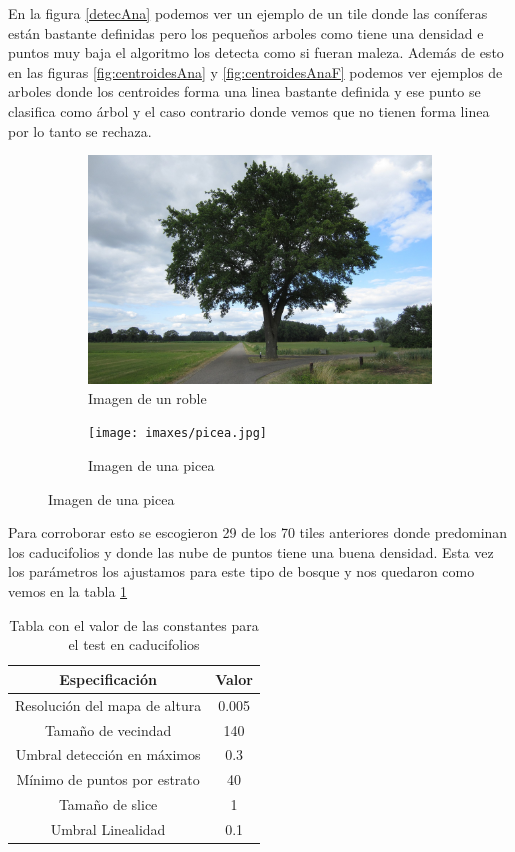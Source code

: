 En la figura \ref{detecAna} podemos ver un ejemplo de un tile donde las coníferas están bastante definidas pero los pequeños arboles como tiene una densidad e puntos muy baja el algoritmo los detecta como si fueran maleza. Además de esto en las figuras \ref{fig:centroidesAna} y \ref{fig:centroidesAnaF} podemos ver ejemplos de arboles donde los centroides forma una linea bastante definida y ese punto se clasifica como árbol y el caso contrario donde vemos que no tienen forma linea por lo tanto se rechaza.



\begin{figure}
  \begin{subfigure}{0.5\textwidth}
    \centering
    \includegraphics[width=0.8\linewidth]{imaxes/2019-07-03_Eik_in_Kerspel_Goor.jpg}
    \caption{Imagen de un roble}
  \end{subfigure}%
  \begin{subfigure}{0.5\textwidth}
    \centering
    \texttt{[image: imaxes/picea.jpg]}
    \caption{Imagen de una picea}
  \end{subfigure}
\end{figure}

Para corroborar esto se escogieron 29 de los 70 tiles anteriores donde predominan los caducifolios y donde las nube de puntos tiene una buena densidad. Esta vez los parámetros los ajustamos para este tipo de bosque y nos quedaron como vemos en la tabla \ref{tablavar2}

\begin{table}[h]
\centering
{}
\begin{tabular}{c|c}
\rowcolor{udcpink!25}
\textbf{Especificación} & \textbf{Valor} \\\hline


Resolución del mapa de altura & 0.005 \\
Tamaño de vecindad & 140 \\
Umbral detección en máximos & 0.3 \\
Mínimo de puntos por estrato & 40 \\
Tamaño de slice & 1 \\
Umbral Linealidad & 0.1 \\

\end{tabular}
\caption{Tabla con el valor de las constantes para el test en caducifolios}
\label{tablavar2}
\end{table}

